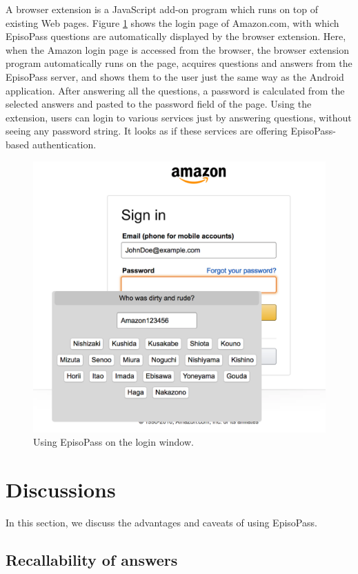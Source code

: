 \documentclass[runningheads,a4paper]{llncs}
\begin{document}
A browser extension is a JavaScript add-on program which runs
on top of existing Web pages.
%
Figure \ref{extension} shows the login page of Amazon.com, with which
EpisoPass questions are automatically displayed by the browser extension.
%
Here, when the Amazon login page is accessed from the browser,
the browser extension program automatically runs on the page,
acquires questions and answers from the EpisoPass server,
and shows them to the user just the same way as the Android application.
%
After answering all the questions, a password is calculated from the
selected answers and pasted to the password field of the page.
Using the extension, users can login to various services just by
answering questions, without seeing any password string.
It looks as if these services are offering
EpisoPass-based authentication.

\begin{figure}[H]
\centering
\includegraphics[width=0.9\columnwidth]{figures/aeff16ffcab956e554364e9e5aca8359}
\caption{Using EpisoPass on the login window.}
\label{extension}
\end{figure}

\section{Discussions}

In this section, we discuss the advantages and caveats of using EpisoPass.

\subsection{Recallability of answers}
\end{document}
